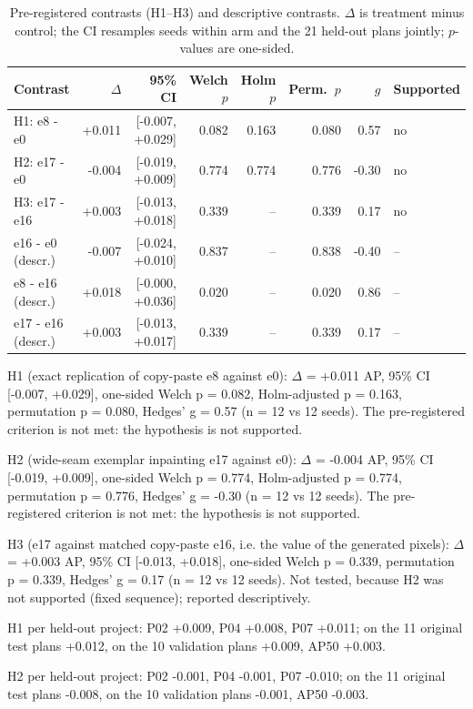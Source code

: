 \begin{table}[H]
\centering
\caption{Pre-registered contrasts (H1--H3) and descriptive contrasts. $\Delta$ is treatment minus control; the CI resamples seeds within arm and the 21 held-out plans jointly; $p$-values are one-sided.}
\label{tab:confirmtests}
\small
\begin{tabular}{@{}lrrrrrrl@{}}
\toprule
Contrast & $\Delta$ & 95\% CI & Welch $p$ & Holm $p$ & Perm.\ $p$ & $g$ & Supported \\
\midrule
H1: e8 - e0 & +0.011 & [-0.007, +0.029] & 0.082 & 0.163 & 0.080 & 0.57 & no \\
H2: e17 - e0 & -0.004 & [-0.019, +0.009] & 0.774 & 0.774 & 0.776 & -0.30 & no \\
H3: e17 - e16 & +0.003 & [-0.013, +0.018] & 0.339 & -- & 0.339 & 0.17 & no \\
e16 - e0 (descr.) & -0.007 & [-0.024, +0.010] & 0.837 & -- & 0.838 & -0.40 & -- \\
e8 - e16 (descr.) & +0.018 & [-0.000, +0.036] & 0.020 & -- & 0.020 & 0.86 & -- \\
e17 - e16 (descr.) & +0.003 & [-0.013, +0.017] & 0.339 & -- & 0.339 & 0.17 & -- \\
\bottomrule
\end{tabular}
\end{table}

H1 (exact replication of copy-paste e8 against e0): $\Delta$ = +0.011 AP, 95\% CI [-0.007, +0.029], one-sided Welch p = 0.082, Holm-adjusted p = 0.163, permutation p = 0.080, Hedges' g = 0.57 (n = 12 vs 12 seeds). The pre-registered criterion is not met: the hypothesis is not supported.

H2 (wide-seam exemplar inpainting e17 against e0): $\Delta$ = -0.004 AP, 95\% CI [-0.019, +0.009], one-sided Welch p = 0.774, Holm-adjusted p = 0.774, permutation p = 0.776, Hedges' g = -0.30 (n = 12 vs 12 seeds). The pre-registered criterion is not met: the hypothesis is not supported.

H3 (e17 against matched copy-paste e16, i.e. the value of the generated pixels): $\Delta$ = +0.003 AP, 95\% CI [-0.013, +0.018], one-sided Welch p = 0.339, permutation p = 0.339, Hedges' g = 0.17 (n = 12 vs 12 seeds). Not tested, because H2 was not supported (fixed sequence); reported descriptively.

H1 per held-out project: P02 +0.009, P04 +0.008, P07 +0.011; on the 11 original test plans +0.012, on the 10 validation plans +0.009, AP50 +0.003.

H2 per held-out project: P02 -0.001, P04 -0.001, P07 -0.010; on the 11 original test plans -0.008, on the 10 validation plans -0.001, AP50 -0.003.

